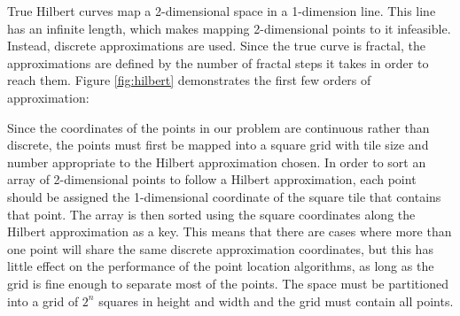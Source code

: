 True Hilbert curves map a 2-dimensional space in a 1-dimension line. This line has an infinite length, which makes mapping 2-dimensional points to it infeasible. Instead, discrete approximations are used. Since the true curve is fractal, the approximations are defined by the number of fractal steps it takes in order to reach them. Figure \ref*{fig:hilbert} demonstrates the first few orders of approximation:

\noindent
Since the coordinates of the points in our problem are continuous rather than discrete, the points must first be mapped into a square grid with tile size and number appropriate to the Hilbert approximation chosen.
In order to sort an array of 2-dimensional points to follow a Hilbert approximation, each point should be assigned the 1-dimensional coordinate of the square tile that contains that point. The array is then sorted using the square coordinates along the Hilbert approximation as a key.
This means that there are cases where more than one point will share the same discrete approximation coordinates, but this has little effect on the performance of the point location algorithms, as long as the grid is fine enough to separate most of the points. The space must be partitioned into a grid of $2^n$ squares in height and width and the grid must contain all points.

